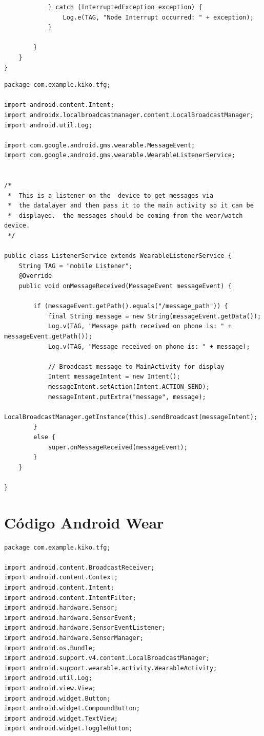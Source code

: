 \documentclass[12pt]{book}
\numberwithin{equation}{section}
\begin{document}
\begin{appendices}
\begin{verbatim}
            } catch (InterruptedException exception) {
                Log.e(TAG, "Node Interrupt occurred: " + exception);
            }

        }
    }
}
\end{verbatim}

\newpage

\begin{verbatim}
package com.example.kiko.tfg;

import android.content.Intent;
import androidx.localbroadcastmanager.content.LocalBroadcastManager;
import android.util.Log;

import com.google.android.gms.wearable.MessageEvent;
import com.google.android.gms.wearable.WearableListenerService;


/*
 *  This is a listener on the  device to get messages via
 *  the datalayer and then pass it to the main activity so it can be
 *  displayed.  the messages should be coming from the wear/watch device.
 */

public class ListenerService extends WearableListenerService {
    String TAG = "mobile Listener";
    @Override
    public void onMessageReceived(MessageEvent messageEvent) {

        if (messageEvent.getPath().equals("/message_path")) {
            final String message = new String(messageEvent.getData());
            Log.v(TAG, "Message path received on phone is: " + messageEvent.getPath());
            Log.v(TAG, "Message received on phone is: " + message);

            // Broadcast message to MainActivity for display
            Intent messageIntent = new Intent();
            messageIntent.setAction(Intent.ACTION_SEND);
            messageIntent.putExtra("message", message);
            LocalBroadcastManager.getInstance(this).sendBroadcast(messageIntent);
        }
        else {
            super.onMessageReceived(messageEvent);
        }
    }

}

\end{verbatim}


\chapter{Código Android Wear}
\begin{verbatim}
package com.example.kiko.tfg;

import android.content.BroadcastReceiver;
import android.content.Context;
import android.content.Intent;
import android.content.IntentFilter;
import android.hardware.Sensor;
import android.hardware.SensorEvent;
import android.hardware.SensorEventListener;
import android.hardware.SensorManager;
import android.os.Bundle;
import android.support.v4.content.LocalBroadcastManager;
import android.support.wearable.activity.WearableActivity;
import android.util.Log;
import android.view.View;
import android.widget.Button;
import android.widget.CompoundButton;
import android.widget.TextView;
import android.widget.ToggleButton;


\end{verbatim}
\end{appendices}
\end{document}
